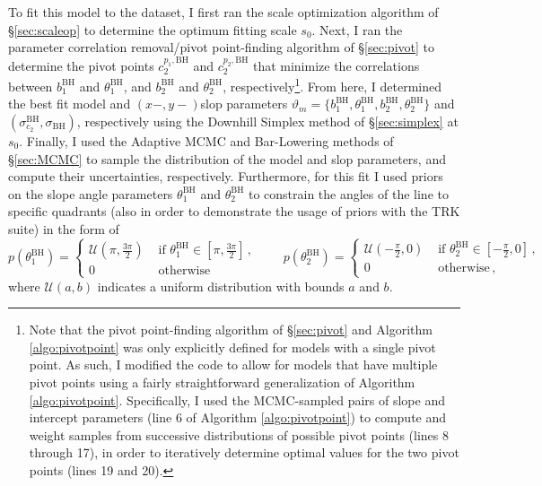 To fit this model to the dataset, I first ran the scale optimization algorithm of \S\ref{sec:scaleop} to determine the optimum fitting scale $s_0$. Next, I ran the parameter correlation removal/pivot point-finding algorithm of \S\ref{sec:pivot} to determine the pivot points $c_2^{p_1,\text{BH}}$ and $c_2^{p_2,\text{BH}}$ that minimize the correlations between $b_1^{\text{BH}}$ and $\theta_1^{\text{BH}}$, and $b_2^{\text{BH}}$ and $\theta_2^{\text{BH}}$, respectively\footnote{Note that the pivot point-finding algorithm of \S\ref{sec:pivot} and Algorithm \ref{algo:pivotpoint} was only explicitly defined for models with a single pivot point. As such, I modified the code to allow for models that have multiple pivot points using a fairly straightforward generalization of Algorithm \ref{algo:pivotpoint}. Specifically, I used the MCMC-sampled pairs of slope and intercept parameters (line 6 of Algorithm \ref{algo:pivotpoint}) to compute and weight samples from successive distributions of possible pivot points (lines 8 through 17), in order to iteratively determine optimal values for the two pivot points (lines 19 and 20).}. From here, I determined the best fit model and $(x-,y-)$slop parameters $\vartheta_m=\{b_1^{\text{BH}}, \theta_1^{\text{BH}}, b_2^{\text{BH}}, \theta_2^{\text{BH}}\}$ and $(\sigma_{c_2}^{\text{BH}}, \sigma_{\text{BH}})$, respectively using the Downhill Simplex method of \S\ref{sec:simplex} at $s_0$. Finally, I used the Adaptive MCMC and Bar-Lowering methods of \S\ref{sec:MCMC} to sample the distribution of the model and slop parameters, and compute their uncertainties, respectively. Furthermore, for this fit I used priors on the slope angle parameters $\theta_1^{\text{BH}}$ and $\theta_2^{\text{BH}}$ to constrain the angles of the line to specific quadrants (also in order to demonstrate the usage of priors with the TRK suite) in the form of
\begin{equation}\label{eq:bhc2priors}
p(\theta_1^{\text{BH}}) =  \left\{ \begin{array} {lr}
        \mathcal{U}(\pi, \frac{3\pi}{2}) & \,\,\mbox{if $\theta_1^{\text{BH}} \in [\pi, \frac{3\pi}{2}]$}\, ,\\
        0 & \,\,\mbox{otherwise} \,
        \end{array}\right.
        \qquad
p(\theta_2^{\text{BH}}) =  \left\{ \begin{array} {lr}
        \mathcal{U}(-\frac{\pi}{2}, 0) & \,\,\mbox{if $\theta_2^{\text{BH}} \in [-\frac{\pi}{2}, 0]$}\, ,\\
        0 & \,\,\mbox{otherwise} \,,
        \end{array}\right.
\end{equation}
where $\mathcal{U}(a,b)$ indicates a uniform distribution with bounds $a$ and $b$.

